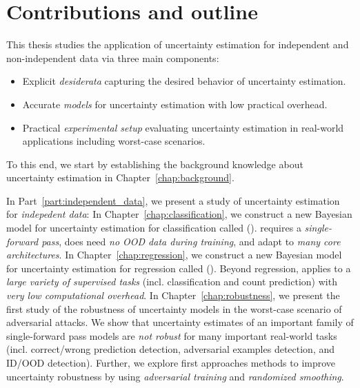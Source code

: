 \section{Contributions and outline}

This thesis studies the application of uncertainty estimation for independent and non-independent data via three main components:
\begin{itemize}
    \item Explicit \emph{desiderata} capturing the desired behavior of uncertainty estimation.
    \item Accurate \emph{models} for uncertainty estimation with low practical overhead.
    \item Practical \emph{experimental setup} evaluating uncertainty estimation in real-world applications including worst-case scenarios.
\end{itemize} 

To this end, we start by establishing the background knowledge about uncertainty estimation in Chapter~\ref{chap:background}.

In Part~\ref{part:independent_data}, we present a study of uncertainty estimation for \emph{indepedent data}: 
In Chapter~\ref{chap:classification}, we construct a new Bayesian model for uncertainty estimation for classification called \PostNet{} (\PostNetacro{}). \PostNetacro{} requires a \emph{single-forward pass}, does need \emph{no OOD data during training}, and adapt to \emph{many core architectures}.
In Chapter~\ref{chap:regression}, we construct a new Bayesian model for uncertainty estimation for regression called \NatPN{} (\NatPNacro{}). Beyond regression, \NatPNacro{} applies to a \emph{large variety of supervised tasks} (incl. classification and count prediction) with \emph{very low computational overhead}.
In Chapter~\ref{chap:robustness}, we present the first study of the robustness of uncertainty models in the worst-case scenario of adversarial attacks. We show that uncertainty estimates of an important family of single-forward pass models are \emph{not robust} for many important real-world tasks (incl. correct/wrong prediction detection, adversarial examples detection, and ID/OOD detection). Further, we explore first approaches methods to improve uncertainty robustness by using \emph{adversarial training} and \emph{randomized smoothing}. 

